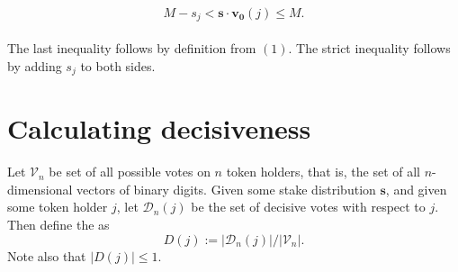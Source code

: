 \documentclass[12pt]{article}
\begin{document}
$$M - s_j < \mathbf{s}\cdot\mathbf{v_0}(j) \leq M.$$\\
The last inequality follows by definition from $(1)$. The strict inequality follows by adding $s_j$ to both sides.


\section{Calculating decisiveness}

Let $\mathcal{V}_n$ be set of all possible votes on $n$ token holders, that is, the set of all $n$-dimensional vectors of binary digits. Given some stake distribution $\mathbf{s}$, and given some token holder $j$, let $\mathcal{D}_n(j)$ be the set of decisive votes with respect to $j$. Then define the  as $$D(j) := |\mathcal{D}_n(j)|/|\mathcal{V}_n|.$$
Note also that $|D(j)|\leq 1$.
\end{document}
